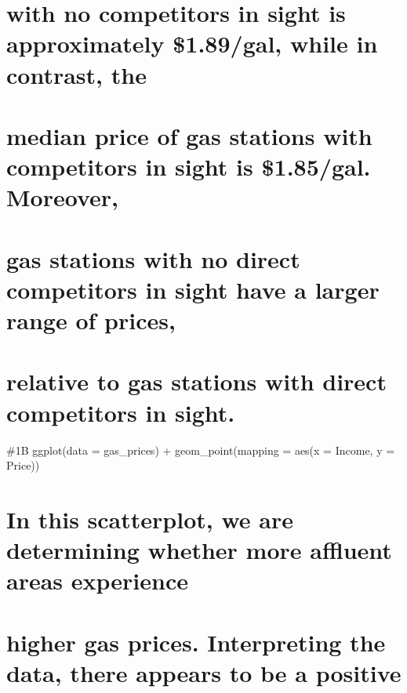 \documentclass[
]{article}
\begin{document}
\hypertarget{with-no-competitors-in-sight-is-approximately-1.89gal-while-in-contrast-the}{%
\section{with no competitors in sight is approximately \$1.89/gal, while
in contrast,
the}\label{with-no-competitors-in-sight-is-approximately-1.89gal-while-in-contrast-the}}

\hypertarget{median-price-of-gas-stations-with-competitors-in-sight-is-1.85gal.-moreover}{%
\section{median price of gas stations with competitors in sight is
\$1.85/gal.
Moreover,}\label{median-price-of-gas-stations-with-competitors-in-sight-is-1.85gal.-moreover}}

\hypertarget{gas-stations-with-no-direct-competitors-in-sight-have-a-larger-range-of-prices}{%
\section{gas stations with no direct competitors in sight have a larger
range of
prices,}\label{gas-stations-with-no-direct-competitors-in-sight-have-a-larger-range-of-prices}}

\hypertarget{relative-to-gas-stations-with-direct-competitors-in-sight.}{%
\section{relative to gas stations with direct competitors in
sight.}\label{relative-to-gas-stations-with-direct-competitors-in-sight.}}

\#1B ggplot(data = gas\_prices) + geom\_point(mapping = aes(x = Income,
y = Price))

\hypertarget{in-this-scatterplot-we-are-determining-whether-more-affluent-areas-experience}{%
\section{In this scatterplot, we are determining whether more affluent
areas
experience}\label{in-this-scatterplot-we-are-determining-whether-more-affluent-areas-experience}}

\hypertarget{higher-gas-prices.-interpreting-the-data-there-appears-to-be-a-positive}{%
\section{higher gas prices. Interpreting the data, there appears to be a
positive}\label{higher-gas-prices.-interpreting-the-data-there-appears-to-be-a-positive}}
\end{document}
